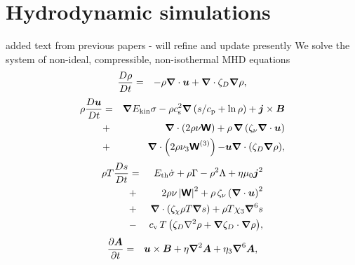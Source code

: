 \documentclass[fleqn,usenatbib]{mnras}
\newcommand{\fg}[1]{\textcolor{mypurple}{#1}}
\newcommand\ESK{E_{\rm kin}}
\newcommand\EST{E_{\rm th}}
\newcommand{\vect}[1]{{{\mbox{\boldmath $#1$}}}}%
\begin{document}
\section{Hydrodynamic simulations}
\fg{added text from previous papers - will refine and update presently}
 We solve the system of non-ideal, compressible, non-isothermal MHD equations
  \begin{eqnarray}
  \label{eq:mass}
    \frac{D\rho}{Dt} &=& 
    -\rho \vect\nabla \cdot \vect{u}
    +\vect\nabla \cdot\zeta_D\vect\nabla\rho,
  \end{eqnarray}
  \begin{eqnarray}
  \label{eq:mom}
    \rho\frac{D\vect{u}}{Dt} &=& 
    \vect\nabla{\ESK\sigma}
    -\rho c_{\rm s}^2\vect\nabla\left({s}/{c_{\rm p}}+\ln\rho\right)
    +\vect{j}\times\vect{B}
    \nonumber\\
    &+&\vect\nabla\cdot \left(2\rho\nu{\mathbfss W}\right)
    +\rho\,\vect\nabla\left(\zeta_{\nu}\vect\nabla \cdot \vect{u} \right)
    \nonumber\\
    &+&\vect\nabla\cdot \left(2\rho\nu_3{\mathbfss W}^{(3)}\right)
  {-\vect u\vect{\nabla}\cdot\left(\zeta_D\vect{\nabla}\rho\right)},
  \end{eqnarray}
  \begin{eqnarray}
  \label{eq:ent}
    \rho T\frac{D s}{Dt} &=&
     \EST\dot\sigma +\rho\Gamma
    -\rho^2\Lambda +\eta\mu_0\vect{j}^2 
    \nonumber\\
    &+&2 \rho \nu\left|{\mathbfss W}\right|^{2}
    +\rho\,\zeta_{\nu}\left(\vect\nabla \cdot \vect{u} \right)^2
    \nonumber\\
    &+&\vect\nabla\cdot\left(\zeta_\chi\rho T\vect\nabla s\right)
    +\rho T\chi_3\vect\nabla^6 s
    \nonumber\\
    &-& {c_{\rm{v}}\,T \left(
    \zeta_D\nabla^2\rho + \vect\nabla\zeta_D\cdot\vect\nabla\rho\right)},
  \end{eqnarray}
  \begin{eqnarray}
  \label{eq:ind}
    \frac{\partial \vect{A}}{\partial t} &=&
    \vect{u}\times\vect{B}
    +\eta\vect\nabla^2\vect{A}
    +\eta_3\vect\nabla^6\vect{A},
  \end{eqnarray}
\end{document}
